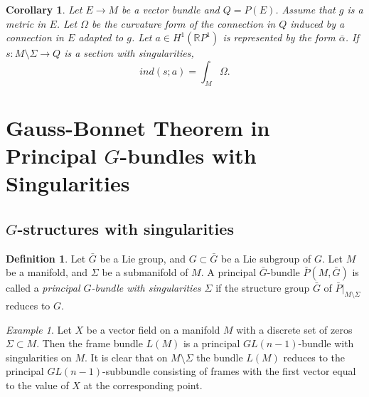 \documentclass[12pt,letterpaper]{amsart}
\theoremstyle{definition}
\newtheorem{df}{Definition}
\theoremstyle{plain}
\newtheorem{cor}{Corollary}
\theoremstyle{remark}
\newtheorem{ex}{Example}
\begin{document}
\begin{cor}
Let $E \to M$ be a vector bundle and $Q = P(E)$.
Assume that $g$ is a metric in $E$.
Let $\Omega$ be the curvature form of the connection in $Q$ induced by a connection in $E$ adapted to $g$.
Let $a \in H^1(\mathbb{R}P^1)$ is represented by the form $\bar \alpha$.
If $s : M \setminus \Sigma \to Q$ is a section with singularities,
\begin{equation}
ind (s; a) = \int_M \Omega.
\label{eq:73}
\end{equation}
\label{cor:3}
\end{cor}


\section{Gauss-Bonnet Theorem in Principal $G$-bundles with Singularities}
\label{sec:5}

\subsection{$G$-structures with singularities}
\label{subsec:5_1}
\begin{df}
Let $\bar{G}$ be a Lie group, and $G\subset \bar{G}$ be a Lie subgroup of $G$.
Let $M$ be a manifold, and $\Sigma$ be a submanifold of $M$.
A principal $\bar{G}$-bundle $\bar{P}(M, \bar{G})$ is called a \emph{principal $G$-bundle with singularities $\Sigma$} if the structure group $\bar{G}$ of $\bar{P}|_{M\setminus \Sigma}$ reduces to $G$.
\label{df:5}
\end{df}
\begin{ex}
Let $X$ be a vector field on a manifold $M$ with a discrete set of zeros $\Sigma \subset M$.
Then the frame bundle $L(M)$ is a principal $GL(n-1)$-bundle with singularities on $M$.
It is clear that on $M \setminus \Sigma$ the bundle $L(M)$ reduces to the principal $GL(n-1)$-subbundle consisting of frames with the first vector equal to the value of $X$ at the corresponding point.
\label{ex:7}
\end{ex}
\end{document}
